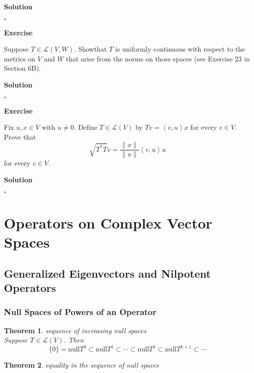 \documentclass{article}
\newtheorem{theorem}{Theorem}[subsection]
\newenvironment{exercise}{%
{\textbf{Exercise\\}
    }
}{
}
\newenvironment{solution}{%
{
    \textbf{Solution\\}
    }
}{
  \hfill $\square$ 
  \par\bigskip 
}
\newcommand{\n}{\text{null}}
\begin{document}
\begin{CJK}{UTF8}{gkai}
\begin{solution}
    
\end{solution}

\begin{exercise}
    Suppose $T \in \mathcal{L}(V,W)$. Showthat $T$ is uniformly continuous with respect to the metrics on $V$ and $W$ that arise from the norms on those spaces (see Exercise 23 in Section 6B).
\end{exercise}

\begin{solution}
    
\end{solution}

\begin{exercise}    
    Fix $u,x \in V$ with $u \neq 0$. Define $T \in \mathcal{L}(V)$ by $Tv = \left<v,u\right>x $ for every $v \in V$. Prove that 
    \[\sqrt{T^\ast T } v = \dfrac{\|x\|}{\|u\|} \left<v, u\right>u\]
    for every $v \in V$.
\end{exercise}

\begin{solution}
    
\end{solution}

\section{Operators on Complex Vector Spaces}

\subsection{Generalized Eigenvectors and Nilpotent Operators}

\subsubsection{Null Spaces of Powers of an Operator}

\begin{theorem}
    sequence of increasing null spaces\\
    Suppose $T \in \mathcal{L}(V)$. Then
    \[\{0\} = \n T^0 \subset \n T^1 \subset \cdots \subset \n T^k \subset \n T^{k+1} \subset \cdots\]
\end{theorem}

\begin{theorem}
    equality in the sequence of null spaces\\


\end{theorem}
\end{CJK}
\end{document}
